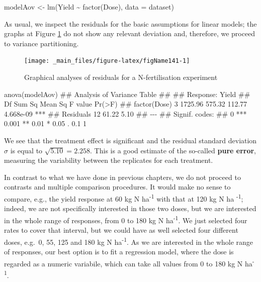 \documentclass[a4paper,12pt,oneside]{book}
\newenvironment{Shaded}{\begin{snugshade}}{\end{snugshade}}
\newcommand{\SpecialCharTok}[1]{#1}
\newcommand{\DocumentationTok}[1]{#1}
\newcommand{\OtherTok}[1]{#1}
\newcommand{\FunctionTok}[1]{#1}
\newcommand{\AttributeTok}[1]{#1}
\newcommand{\NormalTok}[1]{#1}
\begin{document}
\begin{Shaded}
\begin{Highlighting}[]
\NormalTok{modelAov }\OtherTok{\textless{}{-}} \FunctionTok{lm}\NormalTok{(Yield }\SpecialCharTok{\textasciitilde{}} \FunctionTok{factor}\NormalTok{(Dose), }\AttributeTok{data =}\NormalTok{ dataset)}
\end{Highlighting}
\end{Shaded}

As usual, we inspect the residuals for the basic assumptions for linear models; the graphs at Figure \ref{fig:figName141} do not show any relevant deviation and, therefore, we proceed to variance partitioning.

\begin{figure}

{\centering \texttt{[image: \_main\_files/figure-latex/figName141-1]} 

}

\caption{Graphical analyses of residuals for a N-fertilisation experiment}\label{fig:figName141}
\end{figure}

\begin{Shaded}
\begin{Highlighting}[]
\FunctionTok{anova}\NormalTok{(modelAov)}
\DocumentationTok{\#\# Analysis of Variance Table}
\DocumentationTok{\#\# }
\DocumentationTok{\#\# Response: Yield}
\DocumentationTok{\#\#              Df  Sum Sq Mean Sq F value    Pr(\textgreater{}F)    }
\DocumentationTok{\#\# factor(Dose)  3 1725.96  575.32  112.77 4.668e{-}09 ***}
\DocumentationTok{\#\# Residuals    12   61.22    5.10                      }
\DocumentationTok{\#\# {-}{-}{-}}
\DocumentationTok{\#\# Signif. codes:  }
\DocumentationTok{\#\# 0 \textquotesingle{}***\textquotesingle{} 0.001 \textquotesingle{}**\textquotesingle{} 0.01 \textquotesingle{}*\textquotesingle{} 0.05 \textquotesingle{}.\textquotesingle{} 0.1 \textquotesingle{} \textquotesingle{} 1}
\end{Highlighting}
\end{Shaded}

We see that the treatment effect is significant and the residual standard deviation \(\sigma\) is equal to \(\sqrt{5.10} = 2.258\). This is a good estimate of the so-called \textbf{pure error}, measuring the variability between the replicates for each treatment.

In contrast to what we have done in previous chapters, we do not proceed to contrasts and multiple comparison procedures. It would make no sense to compare, e.g., the yield response at 60 kg N ha\textsuperscript{-1} with that at 120 kg N ha \textsuperscript{-1}; indeed, we are not specifically interested in those two doses, but we are interested in the whole range of responses, from 0 to 180 kg N ha\textsuperscript{-1}. We just selected four rates to cover that interval, but we could have as well selected four different doses, e.g.~0, 55, 125 and 180 kg N ha\textsuperscript{-1}. As we are interested in the whole range of responses, our best option is to fit a regression model, where the dose is regarded as a numeric variabile, which can take all values from 0 to 180 kg N ha\textsuperscript{-1}.
\end{document}
